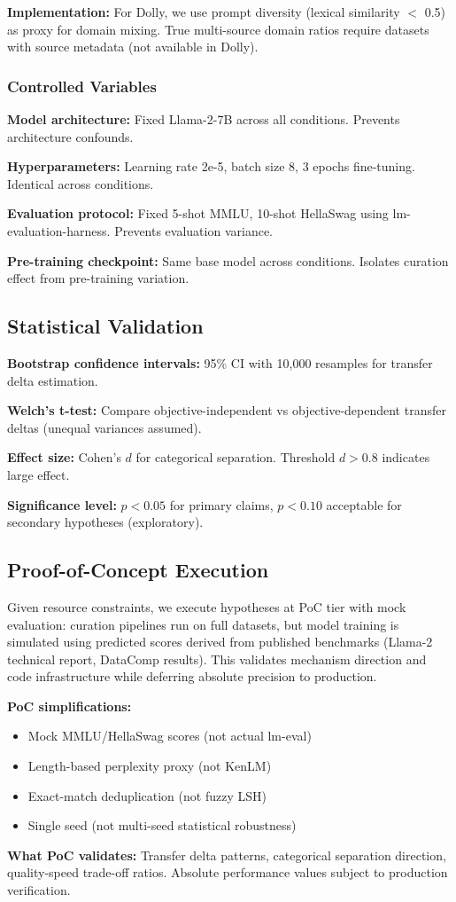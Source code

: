\textbf{Implementation:} For Dolly, we use prompt diversity (lexical similarity $<$ 0.5) as proxy for domain mixing. True multi-source domain ratios require datasets with source metadata (not available in Dolly).

\subsubsection{Controlled Variables}

\textbf{Model architecture:} Fixed Llama-2-7B across all conditions. Prevents architecture confounds.

\textbf{Hyperparameters:} Learning rate 2e-5, batch size 8, 3 epochs fine-tuning. Identical across conditions.

\textbf{Evaluation protocol:} Fixed 5-shot MMLU, 10-shot HellaSwag using lm-evaluation-harness. Prevents evaluation variance.

\textbf{Pre-training checkpoint:} Same base model across conditions. Isolates curation effect from pre-training variation.

\subsection{Statistical Validation}

\textbf{Bootstrap confidence intervals:} 95\% CI with 10,000 resamples for transfer delta estimation.

\textbf{Welch's t-test:} Compare objective-independent vs objective-dependent transfer deltas (unequal variances assumed).

\textbf{Effect size:} Cohen's $d$ for categorical separation. Threshold $d > 0.8$ indicates large effect.

\textbf{Significance level:} $p < 0.05$ for primary claims, $p < 0.10$ acceptable for secondary hypotheses (exploratory).

\subsection{Proof-of-Concept Execution}

Given resource constraints, we execute hypotheses at PoC tier with mock evaluation: curation pipelines run on full datasets, but model training is simulated using predicted scores derived from published benchmarks (Llama-2 technical report, DataComp results). This validates mechanism direction and code infrastructure while deferring absolute precision to production.

\textbf{PoC simplifications:}
\begin{itemize}
\item Mock MMLU/HellaSwag scores (not actual lm-eval)
\item Length-based perplexity proxy (not KenLM)
\item Exact-match deduplication (not fuzzy LSH)
\item Single seed (not multi-seed statistical robustness)
\end{itemize}

\textbf{What PoC validates:} Transfer delta patterns, categorical separation direction, quality-speed trade-off ratios. Absolute performance values subject to production verification.
